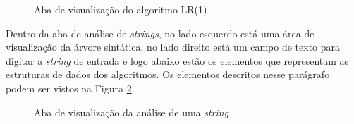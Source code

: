 \begin{figure}[ht]
  \centering
  \captionsetup{width=16cm}
  \caption{Aba de visualização do algoritmo LR(1)}
  \label{fig:malgjan}
\end{figure}

Dentro da aba de análise de \textit{strings}, no lado esquerdo está uma área de visualização da árvore sintática, no lado direito está um campo de texto para digitar a \textit{string} de entrada e logo abaixo estão os elementos que representam as estruturas de dados dos algoritmos. Os elementos descritos nesse parágrafo podem ser vistos na Figura \ref{fig:manalise}.

\begin{figure}[ht]
  \centering
  \captionsetup{width=16cm}
  \caption{Aba de visualização da análise de uma \textit{string}}
  \label{fig:manalise}
\end{figure}

